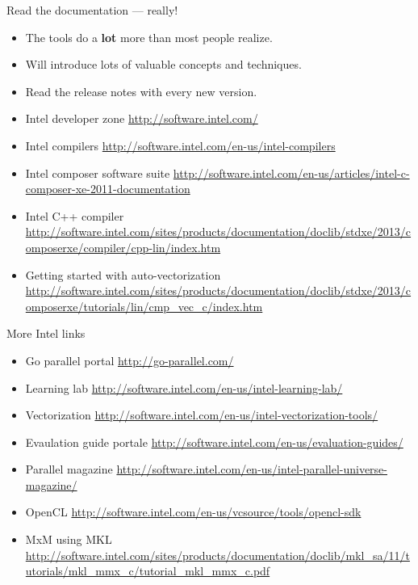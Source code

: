 \begin{frame}{Read the documentation --- really!}

  \begin{itemize}
  \item The tools do a {\bf lot} more than most people realize.
  \item Will introduce lots of valuable concepts and techniques.
  \item Read the release notes with every new version.
  \item Intel developer zone
{\tiny
        \url{http://software.intel.com/}
}
  \item Intel compilers {\tiny
        \url{http://software.intel.com/en-us/intel-compilers}
}
  \item Intel composer software suite
{\tiny
        \url{http://software.intel.com/en-us/articles/intel-c-composer-xe-2011-documentation}
}
  \item Intel C++ compiler
{\tiny
        \url{http://software.intel.com/sites/products/documentation/doclib/stdxe/2013/composerxe/compiler/cpp-lin/index.htm}
}
  \item Getting started with auto-vectorization
{\tiny
        \url{http://software.intel.com/sites/products/documentation/doclib/stdxe/2013/composerxe/tutorials/lin/cmp_vec_c/index.htm}
}
  \end{itemize}

\end{frame}

\begin{frame}{More Intel links}

  \begin{itemize}
  \item Go parallel portal \url{http://go-parallel.com/}
  \item Learning lab \url{http://software.intel.com/en-us/intel-learning-lab/}
  \item Vectorization \url{http://software.intel.com/en-us/intel-vectorization-tools/}
  \item Evaulation guide portale \url{http://software.intel.com/en-us/evaluation-guides/}
  \item Parallel magazine \url{http://software.intel.com/en-us/intel-parallel-universe-magazine/}
  \item OpenCL \url{http://software.intel.com/en-us/vcsource/tools/opencl-sdk}
\item MxM using MKL \url{http://software.intel.com/sites/products/documentation/doclib/mkl_sa/11/tutorials/mkl_mmx_c/tutorial_mkl_mmx_c.pdf}

  \end{itemize}
    
\end{frame}


